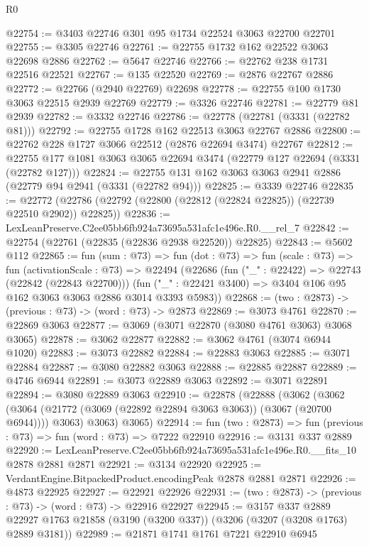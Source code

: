 \begin{lexlean}{R0}
\begin{coremodule}
@22754 := @3403 @22746 @301 @95 @1734 @22524 @3063 @22700 @22701
@22755 := @3305 @22746
@22761 := @22755 @1732 @162 @22522 @3063 @22698 @2886
@22762 := @5647 @22746
@22766 := @22762 @238 @1731 @22516 @22521
@22767 := @135 @22520
@22769 := @2876 @22767 @2886
@22772 := @22766 (@2940 @22769) @22698
@22778 := @22755 @100 @1730 @3063 @22515 @2939 @22769
@22779 := @3326 @22746
@22781 := @22779 @81 @2939
@22782 := @3332 @22746
@22786 := @22778 (@22781 (@3331 (@22782 @81)))
@22792 := @22755 @1728 @162 @22513 @3063 @22767 @2886
@22800 := @22762 @228 @1727 @3066 @22512 (@2876 @22694 @3474) @22767
@22812 := @22755 @177 @1081 @3063 @3065 @22694 @3474 (@22779 @127 @22694 (@3331 (@22782 @127)))
@22824 := @22755 @131 @162 @3063 @3063 @2941 @2886 (@22779 @94 @2941 (@3331 (@22782 @94)))
@22825 := @3339 @22746
@22835 := @22772 (@22786 (@22792 (@22800 (@22812 (@22824 @22825)) (@22739 @22510 @2902)) @22825))
@22836 := LexLeanPreserve.C2ee05bb6fb924a73695a531afc1e496e.R0.__rel_7
@22842 := @22754 (@22761 (@22835 (@22836 @2938 @22520)) @22825)
@22843 := @5602 @112
@22865 := fun (sum : @73) =>
  fun (dot : @73) =>
  fun (scale : @73) =>
  fun (activationScale : @73) =>
  @22494
    (@22686
      (fun ("_" : @22422) => @22743 (@22842 (@22843 @22700)))
      (fun ("_" : @22421 @3400) => @3404 @106 @95 @162 @3063 @3063 @2886 @3014 @3393 @5983))
@22868 := (two : @2873) -> (previous : @73) -> (word : @73) -> @2873
@22869 := @3073 @4761
@22870 := @22869 @3063
@22877 := @3069 (@3071 @22870 (@3080 @4761 @3063) @3068 @3065)
@22878 := @3062 @22877
@22882 := @3062 @4761 (@3074 @6944 @1020)
@22883 := @3073 @22882
@22884 := @22883 @3063
@22885 := @3071 @22884
@22887 := @3080 @22882 @3063
@22888 := @22885 @22887
@22889 := @4746 @6944
@22891 := @3073 @22889 @3063
@22892 := @3071 @22891
@22894 := @3080 @22889 @3063
@22910 := @22878
    (@22888
      (@3062
        (@3062 (@3064 (@21772 (@3069 (@22892 @22894 @3063 @3063)) (@3067 (@20700 @6944)))) @3063)
        @3063)
      @3065)
@22914 := fun (two : @2873) => fun (previous : @73) => fun (word : @73) => @7222 @22910
@22916 := @3131 @337 @2889
@22920 := LexLeanPreserve.C2ee05bb6fb924a73695a531afc1e496e.R0.__fits_10 @2878 @2881 @2871
@22921 := @3134 @22920
@22925 := VerdantEngine.BitpackedProduct.encodingPeak @2878 @2881 @2871
@22926 := @4873 @22925
@22927 := @22921 @22926
@22931 := (two : @2873) -> (previous : @73) -> (word : @73) -> @22916 @22927
@22945 := @3157
    @337
    @2889
    @22927
    @1763
    @21858
    (@3190 (@3200 @337))
    (@3206 (@3207 (@3208 @1763) @2889 @3181))
@22989 := @21871
    @1741
    @1761
    @7221
    @22910
    @6945

\end{coremodule}
\end{lexlean}
